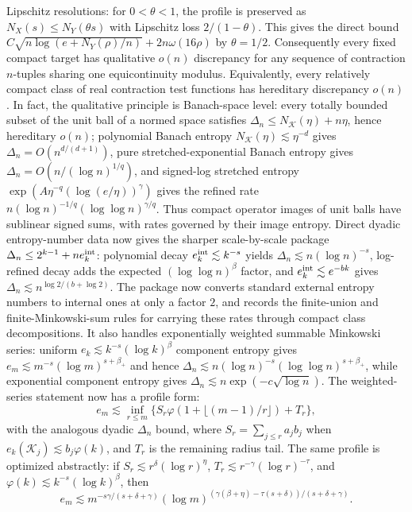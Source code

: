 \documentclass[11pt]{article}
\begin{document}
Lipschitz resolutions: for \(0<\theta<1\), the profile is preserved as
\(N_X(s)\le N_Y(\theta s)\) with Lipschitz loss \(2/(1-\theta)\).  This gives
the direct bound
\(C\sqrt{n\log(e+N_Y(\rho)/n)}+2n\omega(16\rho)\) by \(\theta=1/2\).
Consequently every fixed compact target has qualitative \(o(n)\) discrepancy
for any sequence of contraction \(n\)-tuples sharing one equicontinuity modulus.
Equivalently, every relatively compact class of real contraction test functions
has hereditary discrepancy \(o(n)\).
In fact, the qualitative principle is Banach-space level:
every totally bounded subset of the unit ball of a normed space satisfies
\(\Delta_n\le N_{\mathcal K}(\eta)+n\eta\), hence hereditary \(o(n)\);
polynomial Banach entropy \(N_{\mathcal K}(\eta)\lesssim\eta^{-d}\) gives
\(\Delta_n=O(n^{d/(d+1)})\), pure stretched-exponential Banach entropy gives
\(\Delta_n=O(n/(\log n)^{1/q})\), and signed-log stretched entropy
\(\exp(A\eta^{-q}(\log(e/\eta))^\gamma)\) gives the refined rate
\(n(\log n)^{-1/q}(\log\log n)^{\gamma/q}\).  Thus compact operator images of
unit balls have sublinear signed sums, with rates governed by their image
entropy.
Direct dyadic entropy-number data now gives the sharper scale-by-scale package
\(\Delta_n\le2^{k-1}+n e_k^{\rm int}\): polynomial decay
\(e_k^{\rm int}\lesssim k^{-s}\) yields
\(\Delta_n\lesssim n(\log n)^{-s}\), log-refined decay adds the expected
\((\log\log n)^\beta\) factor, and \(e_k^{\rm int}\lesssim e^{-bk}\) gives
\(\Delta_n\lesssim n^{\log2/(b+\log2)}\).  The package now converts standard
external entropy numbers to internal ones at only a factor \(2\), and records
the finite-union and finite-Minkowski-sum rules for carrying these rates through
compact class decompositions.  It also handles exponentially weighted summable
Minkowski series: uniform \(e_k\lesssim k^{-s}(\log k)^\beta\) component
entropy gives \(e_m\lesssim m^{-s}(\log m)^{s+\beta_+}\) and hence
\(\Delta_n\lesssim n(\log n)^{-s}(\log\log n)^{s+\beta_+}\), while exponential
component entropy gives \(\Delta_n\lesssim n\exp(-c\sqrt{\log n})\).
The weighted-series statement now has a profile form:
\[
  e_m\lesssim \inf_{r\le m}\{S_r\varphi(1+\lfloor(m-1)/r\rfloor)+T_r\},
\]
with the analogous dyadic \(\Delta_n\) bound, where
\(S_r=\sum_{j\le r}a_jb_j\) when
\(e_k(\mathcal K_j)\lesssim b_j\varphi(k)\), and \(T_r\) is the remaining
radius tail.
The same profile is optimized abstractly: if
\(S_r\lesssim r^\delta(\log r)^\eta\),
\(T_r\lesssim r^{-\gamma}(\log r)^{-\tau}\), and
\(\varphi(k)\lesssim k^{-s}(\log k)^\beta\), then
\[
  e_m\lesssim
  m^{-s\gamma/(s+\delta+\gamma)}
  (\log m)^{(\gamma(\beta+\eta)-\tau(s+\delta))/(s+\delta+\gamma)}.
\]
\end{document}
